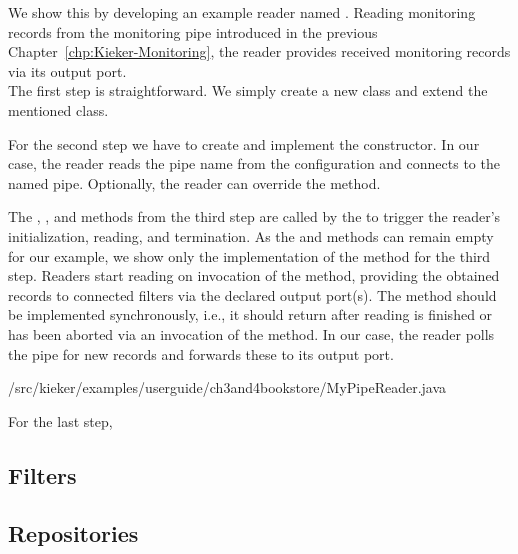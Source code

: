 			\noindent
			We show this by developing an example reader named . Reading monitoring records from the monitoring pipe introduced in the previous Chapter~\ref{chp:Kieker-Monitoring}, the reader provides received monitoring records via its output port.\\
		
			\noindent 
			The first step is straightforward. We simply create a new class and extend the mentioned class.
			\setJavaCodeListing
			
			
			\noindent 
			For the second step we have to create and implement the constructor. In our case, the reader reads the pipe name from the configuration and connects to the named pipe. Optionally, the reader can override the  method.
		
			\setJavaCodeListing
			
			
			\noindent
			The , , and  methods from the third step are called by the  to trigger the reader's initialization, reading, and termination. As the  and  methods can remain empty for our example, we show only the implementation of the  method for the third step. Readers start reading on invocation of the  method, providing the obtained records to connected filters via the declared output port(s). The  method should be implemented synchronously, i.e., it should return after reading is finished or has been aborted via an invocation of the  method. In our case, the reader polls the pipe for new records and forwards these to its output port.
			
			\setJavaCodeListing
			 {\customComponentsBookstoreApplicationDir/src/kieker/examples/userguide/ch3and4bookstore/MyPipeReader.java}
		
			\noindent 
			For the last step, 
		
		\subsection{Filters}
		\subsection{Repositories}
